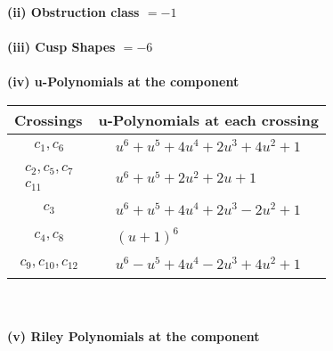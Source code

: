 \documentclass[1p]{elsarticle_modified}
\theoremstyle{definition}
\begin{document}
\flushleft \textbf{(ii) Obstruction class $= -1$}\\~\\
\flushleft \textbf{(iii) Cusp Shapes $= -6$}\\~\\
\newpage\renewcommand{\arraystretch}{1}
\flushleft \textbf{(iv) u-Polynomials at the component}\newline \\
\begin{tabular}{m{50pt}|m{274pt}}
Crossings & \hspace{64pt}u-Polynomials at each crossing \\
\hline $$\begin{aligned}c_{1},c_{6}\end{aligned}$$&$\begin{aligned}
&u^6+u^5+4 u^4+2 u^3+4 u^2+1
\end{aligned}$\\
\hline $$\begin{aligned}c_{2},c_{5},c_{7}\\c_{11}\end{aligned}$$&$\begin{aligned}
&u^6+u^5+2 u^2+2 u+1
\end{aligned}$\\
\hline $$\begin{aligned}c_{3}\end{aligned}$$&$\begin{aligned}
&u^6+u^5+4 u^4+2 u^3-2 u^2+1
\end{aligned}$\\
\hline $$\begin{aligned}c_{4},c_{8}\end{aligned}$$&$\begin{aligned}
&(u+1)^6
\end{aligned}$\\
\hline $$\begin{aligned}c_{9},c_{10},c_{12}\end{aligned}$$&$\begin{aligned}
&u^6- u^5+4 u^4-2 u^3+4 u^2+1
\end{aligned}$\\
\hline
\end{tabular}\\~\\
\newpage\renewcommand{\arraystretch}{1}
\flushleft \textbf{(v) Riley Polynomials at the component}\newline \\
\end{document}
